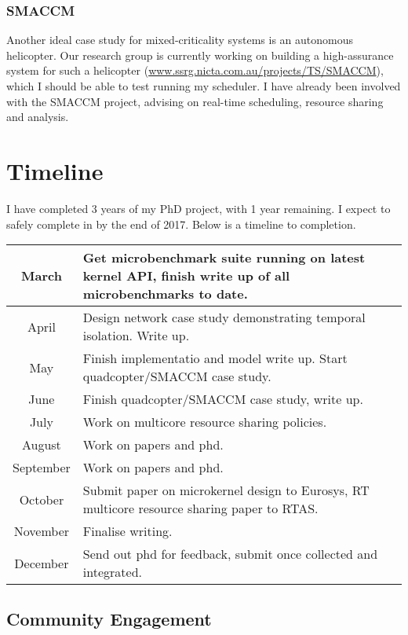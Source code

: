 \subsubsection{SMACCM}

Another ideal case study for mixed-criticality systems is an autonomous helicopter.
Our research group is currently working on building a high-assurance system for such a helicopter (\url{www.ssrg.nicta.com.au/projects/TS/SMACCM}), which I should be able to test running my scheduler.
I have already been involved with the SMACCM project, advising on real-time scheduling, resource sharing and analysis.

\section{Timeline}

I have completed 3 years of my PhD project, with 1 year remaining.
I expect to safely complete in by the end of 2017.
Below is a timeline to completion.

\begin{center}
\begin{tabular}{|c|p{}|}\hline
March & Get microbenchmark suite running on latest kernel API, finish write up of all microbenchmarks to date. \\\hline
April & Design network case study demonstrating temporal isolation. Write up. \\\hline
May & Finish implementatio and model write up. Start quadcopter/SMACCM case study. \\\hline
June & Finish quadcopter/SMACCM case study, write up. \\\hline
July & Work on multicore resource sharing policies. \\\hline
August & Work on papers and phd. \\\hline
September & Work on papers and phd. \\\hline
October & Submit paper on microkernel design to Eurosys, RT multicore resource sharing paper to RTAS. \\\hline
November & Finalise writing. \\\hline
December & Send out phd for feedback, submit once collected and integrated. \\\hline
\end{tabular}
\end{center}

\subsection{Community Engagement}


